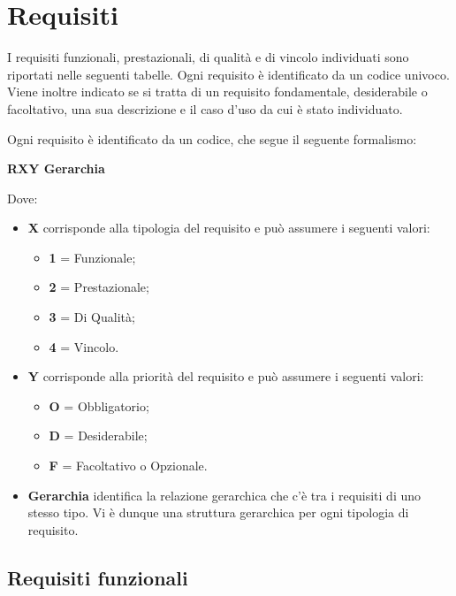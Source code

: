 \section{Requisiti}
I requisiti funzionali, prestazionali, di qualità e di vincolo individuati sono riportati nelle seguenti tabelle. Ogni requisito è identificato da un codice univoco.
Viene inoltre indicato se si tratta di un requisito fondamentale, desiderabile o facoltativo, una sua descrizione e il caso d'uso da cui è stato individuato. 

Ogni requisito è identificato da un codice, che segue il seguente formalismo:
\begin{center}
		\textbf{RXY Gerarchia}
\end{center}

Dove:
\begin{itemize}
 \item \textbf{X} corrisponde alla tipologia del requisito e può assumere i seguenti valori:
		\begin{itemize}
		 \item[] \textbf{1} = Funzionale;
		 \item[] \textbf{2} = Prestazionale;
		 \item[] \textbf{3} = Di Qualità;
		 \item[] \textbf{4} = Vincolo.
		\end{itemize}

 \item \textbf{Y} corrisponde alla priorità del requisito e può assumere i seguenti valori:
		\begin{itemize}
		 \item[] \textbf{O} = Obbligatorio;
		 \item[] \textbf{D} = Desiderabile;
		 \item[] \textbf{F} = Facoltativo o Opzionale.
		\end{itemize}

 \item \textbf{Gerarchia} identifica la relazione gerarchica che c'è tra i requisiti di uno stesso tipo. Vi è dunque una struttura gerarchica per ogni tipologia di requisito.
\end{itemize}

\subsection{Requisiti funzionali}

